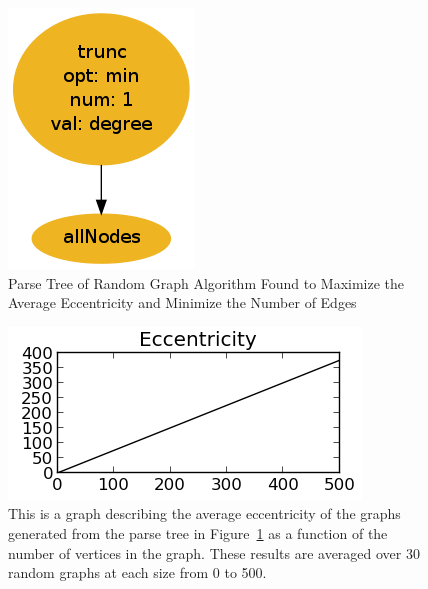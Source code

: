 \documentclass{article}
\begin{document}
\begin{figure}
\begin{centering}
  \includegraphics[scale=0.45]{maxE.png}
  \caption{Parse Tree of Random Graph Algorithm Found to Maximize the Average Eccentricity and Minimize the Number of Edges}
  \label{fig:maxE}
\end{centering}
\end{figure}


\begin{figure}
\begin{centering}
  \includegraphics[scale=1]{maxE2-Eccentricity.png}
  \caption{This is a graph describing the average eccentricity of the graphs generated from the parse tree in Figure~\ref{fig:maxE} as a function of the number of vertices in the graph. 
    These results are averaged over 30 random graphs at each size from 0 to 500.}
  \label{fig:maxE-graph}
\end{centering}
\end{figure}
\end{document}
